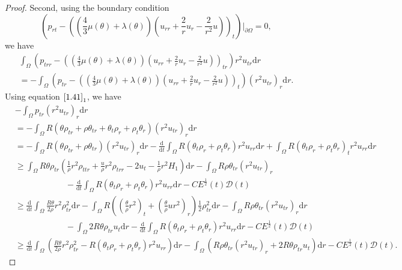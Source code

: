 \documentclass[11pt,reqno]{amsart}
\numberwithin{equation}{section}
\newcommand{\dif}{\mathrm{d}}
\begin{document}
\begin{proof}
 Second, using the boundary condition
 $$
 \left(p_{rt}-\left(\left(\frac{4}{3} \mu(\theta)+\lambda(\theta)\right)\left(u_{rr}+\frac{2}{r}u_r-\frac{2}{r^2} u\right)\right)_{t}\right)|_{\partial \Omega}=0,
 $$
 we have
 \begin{align*}
 \int_{\Omega} \left(p_{trr} -\left(\left(\frac{4}{3} \mu(\theta)+\lambda(\theta)\right)\left(u_{rr}+\frac{2}{r}u_r-\frac{2}{r^2} u\right)\right)_{tr}\right) r^2 u_{tr}\dif r  \\
 =-\int_{\Omega} \left(p_{tr} -\left(\left(\frac{4}{3} \mu(\theta)+\lambda(\theta)\right)\left(u_{rr}+\frac{2}{r}u_r-\frac{2}{r^2} u\right)\right)_{t}\right) (r^2 u_{tr})_r \dif r .
 \end{align*}
Using equation $\eqref{1.41}_1$, we have{\small
 \begin{align*}
 &-\int_{\Omega} p_{tr} (r^2 u_{tr})_r\dif r \\
 &=-\int_{\Omega} R\left( \theta \rho_{tr}+\rho \theta_{tr}+\theta_t \rho_r+\rho_t \theta_r\right) (r^2 u_{tr})_r \dif r\\
 &=-\int_{\Omega} R(\theta \rho_{tr}+\rho \theta_{tr}) (r^2 u_{tr})_r\dif r -\frac{\dif}{\dif t} \int_{\Omega} R(\theta_t \rho_r+\rho_t\theta_r)r^2u_{rr} \dif r+\int_{\Omega} R(\theta_t \rho_r+\rho_t\theta_r)_t r^2 u_{rr} \dif r\\
& \ge \int_{\Omega} R \theta \rho_{tr} \left(\frac{1}{\rho} r^2 \rho_{ttr}+\frac{u}{\rho} r^2 \rho_{trr}-2 u_t-\frac{1}{\rho} r^2 H_1\right) \dif r-\int_{\Omega} R\rho \theta_{tr} (r^2 u_{tr})_r  \\
&\qquad\qquad\qquad-\frac{\dif}{\dif t} \int_{\Omega} R(\theta_t \rho_r+\rho_t\theta_r)r^2u_{rr} \dif r- C E^\frac{1}{2}(t) \mathcal D(t)\\
& \ge \frac{\dif}{\dif t} \int_{\Omega} \frac{R\theta}{2\rho} r^2  \rho_{tr}^2 \dif r -\int_{\Omega} R\left( \left(\frac{\theta}{\rho} r^2\right)_t+\left( \frac{\theta}{\rho} u r^2 \right)_r \right) \frac{1}{2} \rho_{tr}^2 \dif r
 -\int_{\Omega} R\rho \theta_{tr} (r^2 u_{tr})_r \dif r \\
 &\qquad\qquad\qquad -\int_{\Omega} 2 R\theta \rho_{tr} u_t \dif r -\frac{\dif}{\dif t} \int_{\Omega} R(\theta_t \rho_r+\rho_t\theta_r)r^2u_{rr} \dif r - C E^\frac{1}{2}(t) \mathcal D(t)\\
& \ge  \frac{\dif}{\dif t} \int_{\Omega} \left(\frac{R\theta}{2\rho} r^2  \rho_{tr}^2  -R(\theta_t \rho_r+\rho_t\theta_r)r^2u_{rr}\right) \dif r   -\int_{\Omega} (R\rho \theta_{tr} (r^2 u_{tr})_r + 2 R\theta \rho_{tr} u_t )\dif r -  C E^\frac{1}{2}(t) \mathcal D(t).
 \end{align*}}

\end{proof}
\end{document}
